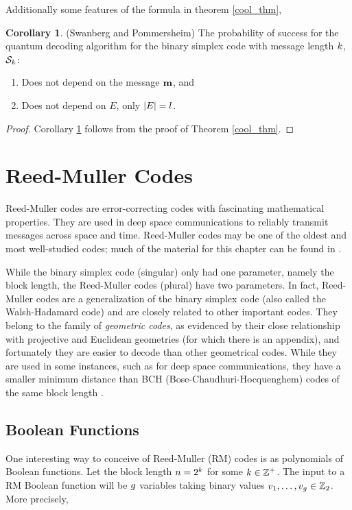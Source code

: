 \documentclass[12pt,twoside]{reedthesis}
\theoremstyle{definition}
\newtheorem{corollary}[theorem]{Corollary}
\newcommand{\Z}{\mathbb{Z}}
\begin{document}
Additionally some features of the formula in theorem \ref{cool_thm}, 
\begin{corollary} \label{corollary}(Swanberg and Pommersheim) The probability of success for the quantum decoding algorithm for the binary simplex code with message length $k$, $\mathcal{S}_{k}$:
\begin{enumerate}
\item Does not depend on the message $\mathbf{m}$, and
\item Does not depend on $E$, only $\lvert E \rvert = l$.
\end{enumerate} 
\end{corollary}
\begin{proof}
Corollary \ref{corollary} follows from the proof of Theorem \ref{cool_thm}.
\end{proof}



\chapter{Reed-Muller Codes}
Reed-Muller codes are error-correcting codes with fascinating mathematical properties.  They are used in deep space communications to reliably transmit messages across space and time. Reed-Muller codes may be one of the oldest and most well-studied codes; much of the material for this chapter can be found in \citep{macwilliamssloane}.

While the binary simplex code (singular) only had one parameter, namely the block length, the Reed-Muller codes (plural) have two parameters. In fact, Reed-Muller codes are a generalization of the binary simplex code (also called the Walsh-Hadamard code) and are closely related to other important codes. They belong to the family of \textit{geometric codes}, as evidenced by their close relationship with projective and Euclidean geometries (for which there is an appendix), and fortunately they are easier to decode than other geometrical codes. While they are used in some instances, such as for deep space communications, they have a smaller minimum distance than BCH (Bose-Chaudhuri-Hocquenghem) codes of the same block length \citep{macwilliamssloane}.


\section{Boolean Functions}
One interesting way to conceive of Reed-Muller (RM) codes is as polynomials of Boolean functions. Let the block length $n = 2^k$ for some $\mlen\in \Z^+$. The input to a RM Boolean function will be $g$ variables taking binary values $\inv{1}, \ldots, \inv{\numin} \in \Z_2$. More precisely,
\end{document}

